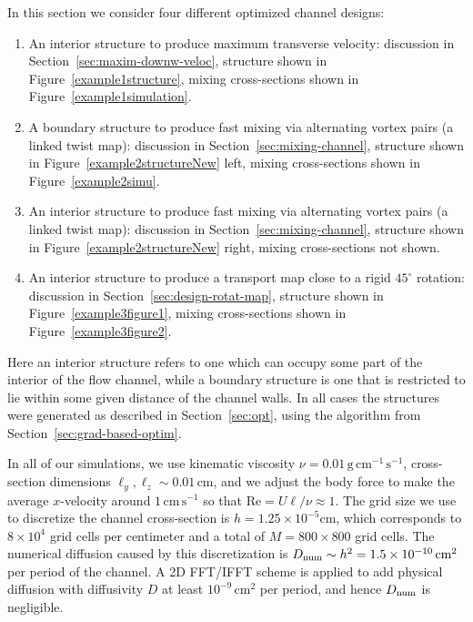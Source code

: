 \documentclass[times]{fldauth}
\begin{document}
In this section we consider four different optimized channel designs:
\begin{enumerate}
\item An interior structure to produce maximum transverse velocity:
  discussion in Section~\ref{sec:maxim-downw-veloc}, structure shown
  in Figure~\ref{example1structure}, mixing cross-sections shown in
  Figure~\ref{example1simulation}.
\item A boundary structure to produce fast mixing via alternating
  vortex pairs (a linked twist map): discussion
  in Section~\ref{sec:mixing-channel}, structure shown in
  Figure~\ref{example2structureNew} left, mixing cross-sections shown in
  Figure~\ref{example2simu}.
\item An interior structure to produce fast mixing via alternating
  vortex pairs (a linked twist map): discussion in
  Section~\ref{sec:mixing-channel}, structure shown in
  Figure~\ref{example2structureNew} right, mixing cross-sections not
  shown.
\item An interior structure to produce a transport map close to a
  rigid $45^\circ$ rotation: discussion in
  Section~\ref{sec:design-rotat-map}, structure shown in
  Figure~\ref{example3figure1}, mixing cross-sections shown in
  Figure~\ref{example3figure2}.
\end{enumerate}
Here an interior structure refers to one which can occupy some part of
the interior of the flow channel, while a boundary structure is one
that is restricted to lie within some given distance of the channel
walls. In all cases the structures were generated as described in
Section~\ref{sec:opt}, using the algorithm from
Section~\ref{sec:grad-based-optim}.

In all of our simulations, we use kinematic viscosity $\nu = 0.01 \,
\text{g} \,\text{cm}^{-1}\, \text{s}^{-1}$, cross-section dimensions
$\ell_y,\ell_z \sim 0.01\,\text{cm}$, and we adjust the body force to
make the average $x$-velocity around $1\,\text{cm}\, \text{s}^{-1}$ so
that $\text{Re} =U\ell/\nu\approx 1$.  The grid size we use to
discretize the channel cross-section is $h=1.25\times
10^{-5}\text{cm}$, which corresponds to $8 \times 10^4$ grid cells per
centimeter and a total of $M = 800 \times 800$ grid cells. The
numerical diffusion caused by this discretization is $D_{\rm num} \sim
h^2 =1.5\times 10^{-10}\,\text{cm}^2$ per period of the channel. A 2D
FFT/IFFT scheme is applied to add physical diffusion with diffusivity
$D$ at least $10^{-9}\,\text{cm}^2$ per period, and hence $D_{\rm
  num}$ is negligible.
\end{document}
